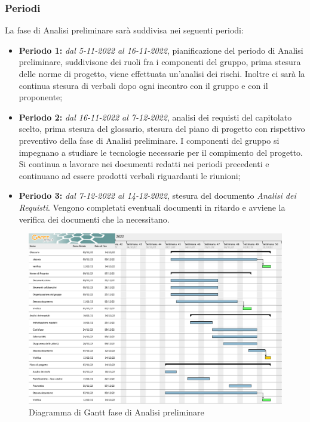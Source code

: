 \subsubsection{Periodi}
La fase di Analisi preliminare sarà suddivisa nei seguenti periodi:
\begin{itemize}
\item \textbf{Periodo 1:} \textit{dal 5-11-2022 al 16-11-2022},  pianificazione del periodo di Analisi preliminare,  suddivisone dei ruoli fra i componenti del gruppo,  prima stesura delle norme di progetto, viene effettuata un'analisi dei rischi.  Inoltre ci sarà la continua stesura di verbali dopo ogni incontro con il gruppo e con il proponente;
\item \textbf{Periodo 2:} \textit{dal 16-11-2022 al 7-12-2022},  analisi dei requisti del capitolato scelto,  prima stesura del glossario, stesura del piano di progetto con rispettivo preventivo della fase di Analisi preliminare.  I componenti del gruppo si impegnano a studiare le tecnologie necessarie per il compimento del progetto. Si continua a lavorare nei documenti redatti nei periodi precedenti e continuano ad essere prodotti verbali riguardanti le riunioni;
\item \textbf{Periodo 3: } \textit{dal 7-12-2022 al 14-12-2022}, stesura del documento \textit{Analisi dei Requisti}. Vengono completati eventuali documenti in ritardo e avviene la verifica dei documenti che la necessitano.
\end{itemize}

\begin{figure}[H]
    \centering
    \includegraphics[scale=0.38]{image/analisi_preliminare_gantt.png}
    \caption{Diagramma di Gantt fase di Analisi preliminare}
\end{figure}
\pagebreak

